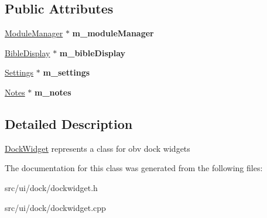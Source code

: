 \subsection*{Public Attributes}
\begin{DoxyCompactItemize}
\item 
\hypertarget{classDockWidget_a7d1970f5fb4eebcc202914550ae9e7fd}{
\hyperlink{classModuleManager}{ModuleManager} $\ast$ {\bfseries m\_\-moduleManager}}
\label{classDockWidget_a7d1970f5fb4eebcc202914550ae9e7fd}

\item 
\hypertarget{classDockWidget_a477365838998b5664b5f163b0f611b5a}{
\hyperlink{classBibleDisplay}{BibleDisplay} $\ast$ {\bfseries m\_\-bibleDisplay}}
\label{classDockWidget_a477365838998b5664b5f163b0f611b5a}

\item 
\hypertarget{classDockWidget_adc29716d2f4afd2d0008bc4c3ea92d16}{
\hyperlink{classSettings}{Settings} $\ast$ {\bfseries m\_\-settings}}
\label{classDockWidget_adc29716d2f4afd2d0008bc4c3ea92d16}

\item 
\hypertarget{classDockWidget_a339c11099f5beade0777376a61650a48}{
\hyperlink{classNotes}{Notes} $\ast$ {\bfseries m\_\-notes}}
\label{classDockWidget_a339c11099f5beade0777376a61650a48}

\end{DoxyCompactItemize}


\subsection{Detailed Description}
\hyperlink{classDockWidget}{DockWidget} represents a class for obv dock widgets 

The documentation for this class was generated from the following files:\begin{DoxyCompactItemize}
\item 
src/ui/dock/dockwidget.h\item 
src/ui/dock/dockwidget.cpp\end{DoxyCompactItemize}
